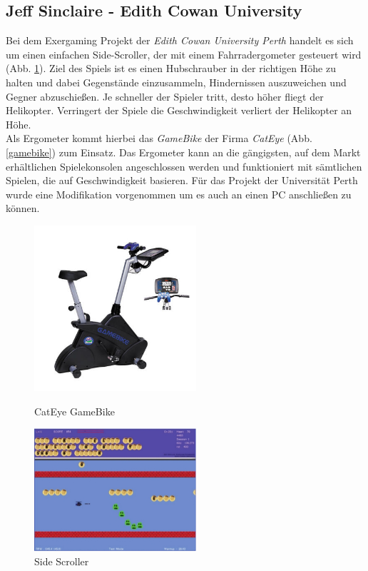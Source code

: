 \subsection{Jeff Sinclaire - Edith Cowan University}
Bei dem Exergaming Projekt der \textit{Edith Cowan University Perth} \cite{5716909} handelt es sich um einen einfachen Side-Scroller, der mit einem Fahrradergometer gesteuert wird (Abb. \ref{sidescroller}). Ziel des Spiels ist es einen Hubschrauber in der richtigen Höhe zu halten und dabei Gegenstände einzusammeln, Hindernissen auszuweichen und Gegner abzuschießen. Je schneller der Spieler tritt, desto höher fliegt der Helikopter. Verringert der Spiele die Geschwindigkeit verliert der Helikopter an Höhe.\\
Als Ergometer kommt hierbei das \textit{GameBike} der Firma \textit{CatEye} (Abb. \ref{gamebike}) zum Einsatz. Das Ergometer kann an die gängigsten, auf dem Markt erhältlichen Spielekonsolen angeschlossen werden und funktioniert mit sämtlichen Spielen, die auf Geschwindigkeit basieren. Für das Projekt der Universität Perth wurde eine Modifikation vorgenommen um es auch an einen PC anschließen zu können.
\begin{figure}[hb]
	\centering
	\begin{minipage}[b]{6 cm}
		\includegraphics[width=6cm]{gfx/recherche/cateye.jpg} 
			\caption{CatEye GameBike}
			\label{gamebike}
	\end{minipage}
	\begin{minipage}[b]{6 cm}
			\includegraphics[width=6cm]{gfx/recherche/edith.jpg}  
			\caption{Side Scroller}
			\label{sidescroller}
	\end{minipage}
\end{figure}

